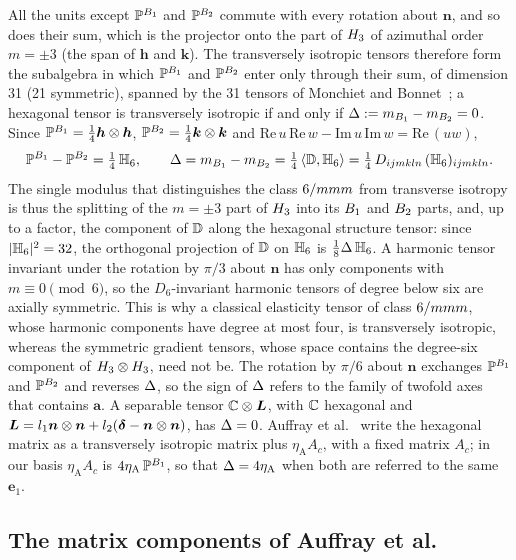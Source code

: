 All the units except $\mathbb{P}^{B_1}$ and $\mathbb{P}^{B_2}$ commute with every rotation about
$\bm n$, and so does their sum, which is the projector onto the part of $H_{3}$ of azimuthal order $m=\pm3$ (the
span of $\bm h$ and $\bm k$). The transversely isotropic tensors therefore form the
subalgebra in which $\mathbb{P}^{B_1}$ and $\mathbb{P}^{B_2}$ enter only through their sum, of dimension
31 (21 symmetric), spanned by the 31 tensors of Monchiet and
Bonnet~\cite[eqs.~(32)--(33)]{Monchiet2013}; a hexagonal tensor is transversely
isotropic if and only if $\Delta:=m_{B_1}-m_{B_2}=0$. Since $\mathbb{P}^{B_1}=\tfrac14\bm h\otimes\bm
h$, $\mathbb{P}^{B_2}=\tfrac14\bm k\otimes\bm k$ and $\mathrm{Re}\,u\,\mathrm{Re}\,w-\mathrm{Im}\,u\,
\mathrm{Im}\,w=\mathrm{Re}\,(uw)$,
\begin{equation}
\mathbb{P}^{B_1}-\mathbb{P}^{B_2}=\tfrac14\,\mathbb{H}_{6},\qquad
\Delta=m_{B_1}-m_{B_2}=\tfrac14\,\langle\mathbb{D},\mathbb{H}_{6}\rangle=\tfrac14\,D_{ijmkln}\,
(\mathbb{H}_{6})_{ijmkln}.\label{eq:hex-extra}
\end{equation}
The single modulus that distinguishes the class $6/mmm$ from transverse isotropy is
thus the splitting of the $m=\pm3$ part of $H_{3}$ into its $B_1$ and $B_2$
parts, and, up to a factor, the component of $\mathbb{D}$ along the hexagonal structure tensor:
since $|\mathbb{H}_{6}|^2=32$, the orthogonal projection of $\mathbb{D}$ on $\mathbb{H}_{6}$ is
$\tfrac18\Delta\,\mathbb{H}_{6}$. A harmonic tensor
invariant under the rotation by $\pi/3$ about $\bm n$ has only components with
$m\equiv0\pmod 6$, so the $D_6$-invariant harmonic tensors of degree below six are
axially symmetric. This is why a classical elasticity tensor of class $6/mmm$, whose
harmonic components have degree at most four, is transversely isotropic, whereas the
symmetric gradient tensors, whose space contains the degree-six component of
$H_{3}\otimes H_{3}$, need not be. The rotation by $\pi/6$ about $\bm n$ exchanges $\mathbb{P}^{B_1}$ and
$\mathbb{P}^{B_2}$ and reverses $\Delta$, so the sign of $\Delta$ refers to the family of twofold
axes that contains $\bm a$. A separable tensor $\mathbb{C}\otimes\bm L$, with $\mathbb{C}$ hexagonal and
$\bm L=l_1\bm n\otimes\bm n+l_2(\bm{\delta}-\bm n\otimes\bm n)$, has $\Delta=0$. Auffray et
al.~\cite[section~3.3.5]{Auffray2013} write the hexagonal matrix as a transversely
isotropic matrix plus $\eta_{\mathrm A}A_c$, with a fixed matrix $A_c$; in our basis
$\eta_{\mathrm A}A_c$ is $4\eta_{\mathrm A}\,\mathbb{P}^{B_1}$, so that $\Delta=4\eta_{\mathrm A}$ when both are referred to the same
$\bm e_1$.

\subsection{The matrix components of Auffray et al.}\label{sec:hex-auffray}

